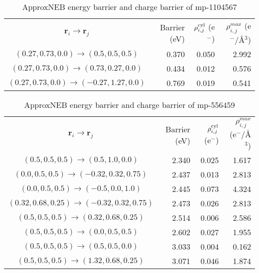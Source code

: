 \documentclass[reprint,preprintnumbers,amsmath,amssymb,aps,prl]{revtex4-1}
\begin{document}
\begin{table}[h]
    \centering
    \caption{ApproxNEB energy barrier and charge barrier of mp-1104567}
    \begin{ruledtabular}
        \begin{tabular}{crrr}
            $\bm{r}_i \rightarrow \bm{r}_j$                  & Barrier (eV) & $\rho^{\rm cyl}_{i,j}$ (e$^{-}$) & $\rho^{max}_{i,j}$ (e$^{-}$/\AA{}$^3$)\\
            \colrule
            $(0.27, 0.73, 0.0)\rightarrow(0.5, 0.5, 0.5)$    & 0.370        & 0.050                            & 2.992          \\
            $(0.27, 0.73, 0.0)\rightarrow(0.73, 0.27, 0.0)$  & 0.434        & 0.012                            & 0.576          \\
            $(0.27, 0.73, 0.0)\rightarrow(-0.27, 1.27, 0.0)$ & 0.769        & 0.019                            & 0.541          \\
        \end{tabular}
    \end{ruledtabular}
\end{table}

\begin{table}[h]
    \centering
    \caption{ApproxNEB energy barrier and charge barrier of mp-556459}
    \begin{ruledtabular}
        \begin{tabular}{crrr}
            $\bm{r}_i \rightarrow \bm{r}_j$                    & Barrier (eV) & $\rho^{\rm cyl}_{i,j}$ (e$^{-}$) & $\rho^{max}_{i,j}$ (e$^{-}$/\AA{}$^3$)\\
            \colrule
            $(0.5, 0.5, 0.5)\rightarrow(0.5, 1.0, 0.0)$        & 2.340        & 0.025                            & 1.617          \\
            $(0.0, 0.5, 0.5)\rightarrow(-0.32, 0.32, 0.75)$    & 2.437        & 0.013                            & 2.813          \\
            $(0.0, 0.5, 0.5)\rightarrow(-0.5, 0.0, 1.0)$       & 2.445        & 0.073                            & 4.324          \\
            $(0.32, 0.68, 0.25)\rightarrow(-0.32, 0.32, 0.75)$ & 2.473        & 0.026                            & 2.813          \\
            $(0.5, 0.5, 0.5)\rightarrow(0.32, 0.68, 0.25)$     & 2.514        & 0.006                            & 2.586          \\
            $(0.5, 0.5, 0.5)\rightarrow(0.0, 0.5, 0.5)$        & 2.602        & 0.027                            & 1.955          \\
            $(0.5, 0.5, 0.5)\rightarrow(0.5, 0.5, 0.0)$        & 3.033        & 0.004                            & 0.162          \\
            $(0.5, 0.5, 0.5)\rightarrow(1.32, 0.68, 0.25)$     & 3.071        & 0.046                            & 1.874          \\
        \end{tabular}
    \end{ruledtabular}
\end{table}
\end{document}
